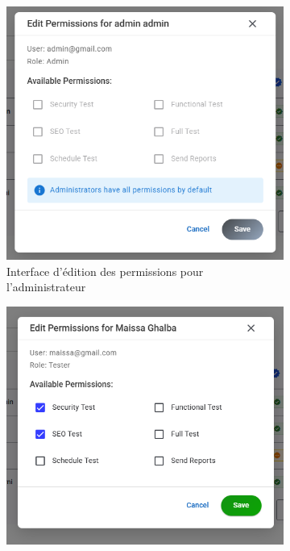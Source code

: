 \begin{justify}
\begin{enumerate}[label=\Alph*.]
\begin{figure}[H]
                    \begin{subfigure}[b]{0.48\linewidth}
                        \centering
                        \includegraphics[width=\linewidth]{chapitres/ch3Sp1/section/sprint1/img/interface/edit-permission-admin.PNG}
                        \caption{\centering Interface d’édition des permissions pour l’administrateur}
                        \label{fig:subfig-admin}
                    \end{subfigure}
                    \hfill
                    \begin{subfigure}[b]{0.51\linewidth}
                        \centering
                        \includegraphics[width=\linewidth]{chapitres/ch3Sp1/section/sprint1/img/interface/edit-permission-users.PNG}

\end{subfigure}
\end{figure}
\end{enumerate}
\end{justify}
